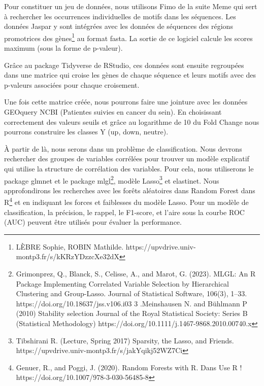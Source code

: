\documentclass[mstat,12pt]{unswthesis}
\begin{document}
\bigskip

Pour constituer un jeu de données, nous utilisons Fimo de la suite Meme
qui sert à rechercher les occurrences individuelles de motifs dans les
séquences. Les données Jaspar y sont intégrées avec les données de
séquences des régions promotrices des
gènes\footnote{ LÈBRE Sophie, ROBIN Mathilde. https://upvdrive.univ-montp3.fr/s/kKRzYDzzcXe32dX}
au format fasta. La sortie de ce logiciel calcule les scores maximum
(sous la forme de p-valeur).

\bigskip

Grâce au package Tidyverse de RStudio, ces données sont ensuite
regroupées dans une matrice qui croise les gènes de chaque séquence et
leurs motifs avec des p-valeurs associées pour chaque croisement.

\bigskip

Une fois cette matrice créée, nous pourrons faire une jointure avec les
données GEOquery NCBI (Patientes suivies en cancer du sein). En
choisissant correctement des valeurs seuils et grâce au logarithme de 10
du Fold Change nous pourrons construire les classes Y (up, down,
neutre).

\bigskip

À partir de là, nous serons dans un problème de classification. Nous
devrons rechercher des groupes de variables corrélées pour trouver un
modèle explicatif qui utilise la structure de corrélation des variables.
Pour cela, nous utiliserons le package glmnet et le package
mlgl\footnote{ Grimonprez, Q., Blanck, S., Celisse, A., and Marot, G. (2023). MLGL: An R Package Implementing Correlated Variable Selection by Hierarchical Clustering and Group-Lasso. Journal of Statistical Software, 106(3), 1–33. https://doi.org/10.18637/jss.v106.i03  3 .Meinshausen N. and Bühlmann P (2010) Stability selection Journal of the Royal Statistical Society: Series B (Statistical Methodology) https://doi.org/10.1111/j.1467-9868.2010.00740.x},
modèle
Lasso\footnote{ Tibshirani R. (Lecture, Spring 2017) Sparsity, the Lasso, and Friends. https://upvdrive.univ-montp3.fr/s/jakYqikj52WZ7Ci}
et elastinet. Nous approfondirons les recherches avec les forêts
aléatoires dans Random Forest dans
R\footnote{ Genuer, R., and Poggi, J. (2020). Random Forests with R. Dans Use R ! https://doi.org/10.1007/978-3-030-56485-8}
et en indiquant les forces et faiblesses du modèle Lasso. Pour un modèle
de classification, la précision, le rappel, le F1-score, et l'aire sous
la courbe ROC (AUC) peuvent être utilisés pour évaluer la performance.
\end{document}
